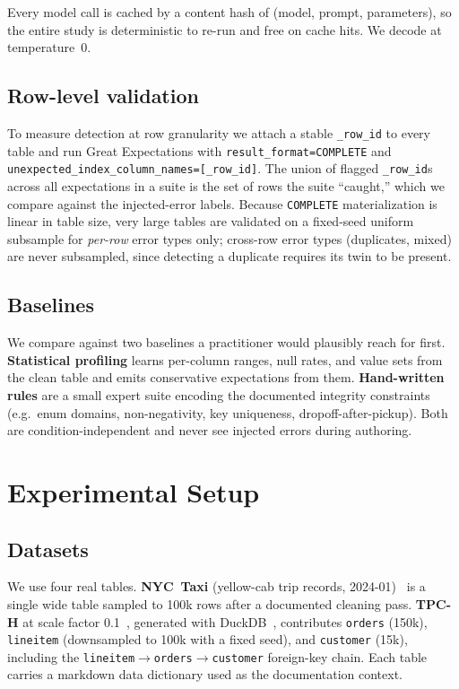 \documentclass[10pt,twocolumn]{article}
\begin{document}
Every model call is cached by a content hash of (model, prompt, parameters), so
the entire study is deterministic to re-run and free on cache hits. We decode at
temperature~0.

\subsection{Row-level validation}
To measure detection at row granularity we attach a stable \texttt{\_row\_id} to
every table and run Great Expectations with \texttt{result\_format=COMPLETE} and
\texttt{unexpected\_index\_column\_names=[\_row\_id]}. The union of flagged
\texttt{\_row\_id}s across all expectations in a suite is the set of rows the
suite ``caught,'' which we compare against the injected-error labels. Because
\texttt{COMPLETE} materialization is linear in table size, very large tables are
validated on a fixed-seed uniform subsample for \emph{per-row} error types only;
cross-row error types (duplicates, mixed) are never subsampled, since detecting a
duplicate requires its twin to be present.

\subsection{Baselines}
We compare against two baselines a practitioner would plausibly reach for first.
\textbf{Statistical profiling} learns per-column ranges, null rates, and value
sets from the clean table and emits conservative expectations from them.
\textbf{Hand-written rules} are a small expert suite encoding the documented
integrity constraints (e.g.\ enum domains, non-negativity, key uniqueness,
dropoff-after-pickup). Both are condition-independent and never see injected
errors during authoring.

\section{Experimental Setup}\label{sec:setup}
\subsection{Datasets}
We use four real tables. \textbf{NYC~Taxi} (yellow-cab trip records,
2024-01)~\cite{nyctaxi} is a single wide table sampled to 100k rows after a
documented cleaning pass. \textbf{TPC-H} at scale factor 0.1~\cite{tpch},
generated with DuckDB~\cite{duckdb}, contributes \texttt{orders} (150k),
\texttt{lineitem} (downsampled to 100k with a fixed seed), and \texttt{customer}
(15k), including the \texttt{lineitem}$\to$\texttt{orders}$\to$\texttt{customer}
foreign-key chain. Each table carries a markdown data dictionary used as the
documentation context.
\end{document}
